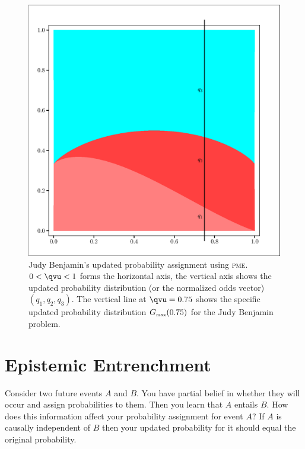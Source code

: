 \documentclass[phd,12pt,oneside]{ubcthesis}
\begin{document}
\begin{figure}[ht!]
    \begin{minipage}[h]{.7\linewidth}
      \includegraphics[width=\textwidth]{zeroone-mxnt.eps}
      \caption{\footnotesize Judy Benjamin's updated probability
        assignment using \textsc{pme}. $0<{\qvu}<1$ forms the
        horizontal axis, the vertical axis shows the updated
        probability distribution (or the normalized odds vector)
        $(q_{1},q_{2},q_{3})$. The vertical line at ${\qvu}=0.75$
        shows the specific updated probability distribution
        $G_{\mbox{\tiny max}}(0.75)$ for the Judy Benjamin problem.}
      \label{fig:mxnt}
    \end{minipage}
\end{figure}

\section{Epistemic Entrenchment}
\label{sec:oochaith}

Consider two future events $A$ and $B$. You have partial belief in
whether they will occur and assign probabilities to them. Then you
learn that $A$ entails $B$. How does this information affect your
probability assignment for event $A$? If $A$ is causally independent
of $B$ then your updated probability for it should equal the original
probability. 
\end{document}
